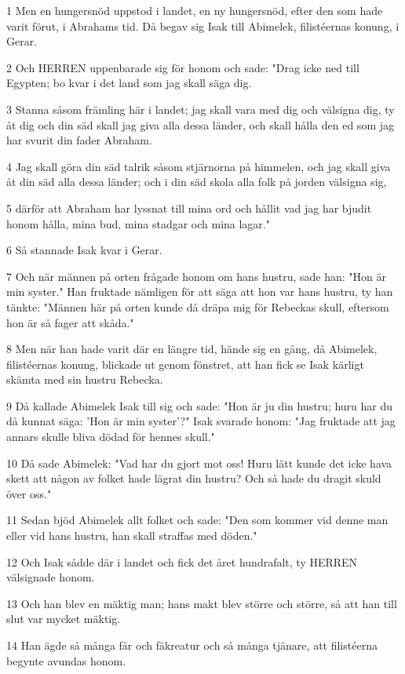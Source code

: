 \par 1 Men en hungersnöd uppstod i landet, en ny hungersnöd, efter den som hade varit förut, i Abrahams tid. Då begav sig Isak till Abimelek, filistéernas konung, i Gerar.
\par 2 Och HERREN uppenbarade sig för honom och sade: "Drag icke ned till Egypten; bo kvar i det land som jag skall säga dig.
\par 3 Stanna såsom främling här i landet; jag skall vara med dig och välsigna dig, ty åt dig och din säd skall jag giva alla dessa länder, och skall hålla den ed som jag har svurit din fader Abraham.
\par 4 Jag skall göra din säd talrik såsom stjärnorna på himmelen, och jag skall giva åt din säd alla dessa länder; och i din säd skola alla folk på jorden välsigna sig,
\par 5 därför att Abraham har lyssnat till mina ord och hållit vad jag har bjudit honom hålla, mina bud, mina stadgar och mina lagar."
\par 6 Så stannade Isak kvar i Gerar.
\par 7 Och när männen på orten frågade honom om hans hustru, sade han: "Hon är min syster." Han fruktade nämligen för att säga att hon var hans hustru, ty han tänkte: "Männen här på orten kunde då dräpa mig för Rebeckas skull, eftersom hon är så fager att skåda."
\par 8 Men när han hade varit där en längre tid, hände sig en gång, då Abimelek, filistéernas konung, blickade ut genom fönstret, att han fick se Isak kärligt skämta med sin hustru Rebecka.
\par 9 Då kallade Abimelek Isak till sig och sade: "Hon är ju din hustru; huru har du då kunnat säga: 'Hon är min syster'?" Isak svarade honom: "Jag fruktade att jag annars skulle bliva dödad för hennes skull."
\par 10 Då sade Abimelek: "Vad har du gjort mot oss! Huru lätt kunde det icke hava skett att någon av folket hade lägrat din hustru? Och så hade du dragit skuld över oss."
\par 11 Sedan bjöd Abimelek allt folket och sade: "Den som kommer vid denne man eller vid hans hustru, han skall straffas med döden."
\par 12 Och Isak sådde där i landet och fick det året hundrafalt, ty HERREN välsignade honom.
\par 13 Och han blev en mäktig man; hans makt blev större och större, så att han till slut var mycket mäktig.
\par 14 Han ägde så många får och fäkreatur och så många tjänare, att filistéerna begynte avundas honom.

